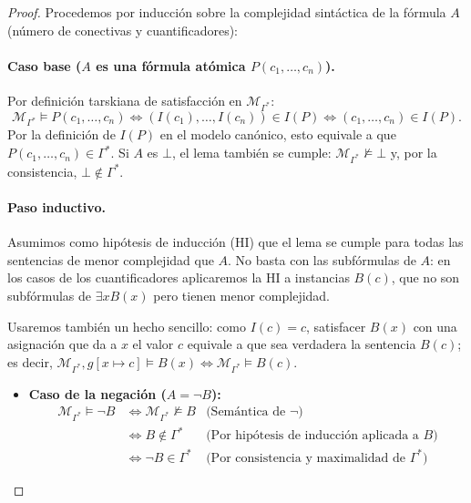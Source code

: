 \begin{proof}
Procedemos por inducción sobre la complejidad sintáctica de la fórmula $A$ (número de conectivas y cuantificadores):

\paragraph{Caso base ($A$ es una fórmula atómica $P(c_1, \dots, c_n)$).}  
Por definición tarskiana de satisfacción en $\mathcal{M}_{\Gamma^*}$:
\[
\mathcal{M}_{\Gamma^*} \models P(c_1, \dots, c_n) \iff (I(c_1), \dots, I(c_n)) \in I(P) \iff (c_1, \dots, c_n) \in I(P).
\]
Por la definición de $I(P)$ en el modelo canónico, esto equivale a que $P(c_1, \dots, c_n) \in \Gamma^*$. Si $A$ es $\bot$, el lema también se cumple: $\mathcal{M}_{\Gamma^*} \not\models \bot$ y, por la consistencia, $\bot \notin \Gamma^*$.

\paragraph{Paso inductivo.}  
Asumimos como hipótesis de inducción (HI) que el lema se cumple para todas las sentencias de menor complejidad que $A$. No basta con las subfórmulas de $A$: en los casos de los cuantificadores aplicaremos la HI a instancias $B(c)$, que no son subfórmulas de $\exists x B(x)$ pero tienen menor complejidad.

Usaremos también un hecho sencillo: como $I(c) = c$, satisfacer $B(x)$ con una asignación que da a $x$ el valor $c$ equivale a que sea verdadera la sentencia $B(c)$; es decir, $\mathcal{M}_{\Gamma^*}, g[x \mapsto c] \models B(x) \iff \mathcal{M}_{\Gamma^*} \models B(c)$.

\begin{itemize}
    \item \textbf{Caso de la negación ($A = \neg B$):}
    \begin{align*}
    \mathcal{M}_{\Gamma^*} \models \neg B &\iff \mathcal{M}_{\Gamma^*}
                                            \not\models B &
                                                            \text{(Semántica
                                                            de $\neg$)} \\
    &\iff B \notin \Gamma^* & \text{(Por hipótesis de inducción aplicada a $B$)} \\
    &\iff \neg B \in \Gamma^* & \text{(Por consistencia y maximalidad de $\Gamma^*$)}
    \end{align*}


\end{itemize}
\end{proof}
